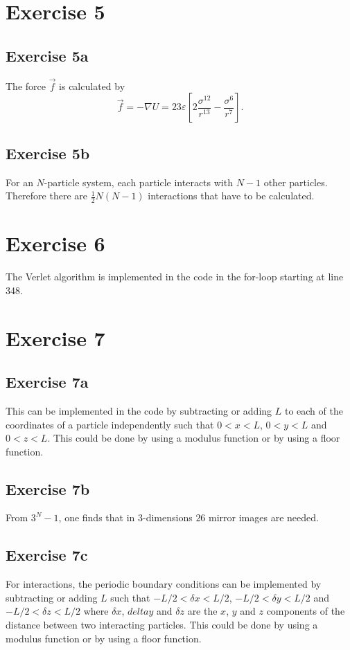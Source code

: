 \documentclass[titlepage]{report}
\begin{document}
\section{Exercise 5}
\subsection{Exercise 5a}
The force $ \vec{f} $ is calculated by
\begin{equation}
	\vec{f} = - \nabla U = 23 \varepsilon \left[ 2 \frac{\sigma^{12}}{r^{13}} - \frac{\sigma^6}{r^7} \right].
\end{equation}

\subsection{Exercise 5b}
For an $ N $-particle system, each particle interacts with $ N-1 $ other particles.
Therefore there are $ \frac{1}{2} N (N-1) $ interactions that have to be calculated.

\section{Exercise 6}
The Verlet algorithm is implemented in the code in the for-loop starting at line 348.

\section{Exercise 7}
\subsection{Exercise 7a}
This can be implemented in the code by subtracting or adding $ L $ to each of the coordinates of a particle independently such that $ 0 < x < L $, $ 0 < y < L $ and $ 0 < z < L $.
This could be done by using a modulus function or by using a floor function.

\subsection{Exercise 7b}
From $ 3^N -1 $, one finds that in $ 3 $-dimensions $ 26 $ mirror images are needed.

\subsection{Exercise 7c}
For interactions, the periodic boundary conditions can be implemented by subtracting or adding $ L $ such that $ -L/2 < \delta x < L/2 $, $ -L/2 < \delta y < L/2 $ and $ -L/2 < \delta z < L/2 $ where $ \delta x $, $ delta y $ and $ \delta z $ are the $ x $, $ y $ and $ z $ components of the distance between two interacting particles. 
This could be done by using a modulus function or by using a floor function.
\end{document}
